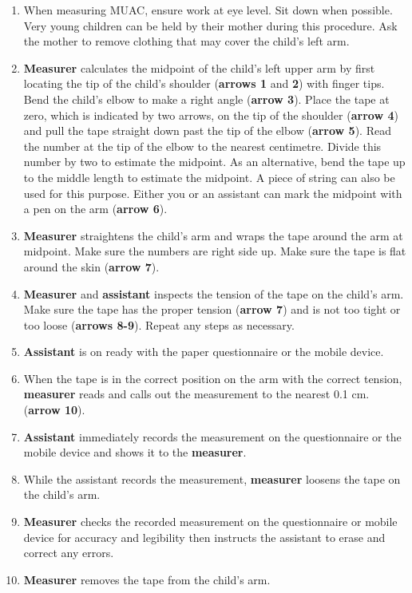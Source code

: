 \documentclass[12pt,]{book}
\theoremstyle{definition}
\theoremstyle{definition}
\theoremstyle{definition}
\theoremstyle{remark}
\begin{document}
\begin{enumerate}
\def\labelenumi{\arabic{enumi}.}
\item
  When measuring MUAC, ensure work at eye level. Sit down when possible.
  Very young children can be held by their mother during this procedure.
  Ask the mother to remove clothing that may cover the child's left arm.
\item
  \textbf{Measurer} calculates the midpoint of the child's left upper
  arm by first locating the tip of the child's shoulder (\textbf{arrows
  1} and \textbf{2}) with finger tips. Bend the child's elbow to make a
  right angle (\textbf{arrow 3}). Place the tape at zero, which is
  indicated by two arrows, on the tip of the shoulder (\textbf{arrow 4})
  and pull the tape straight down past the tip of the elbow
  (\textbf{arrow 5}). Read the number at the tip of the elbow to the
  nearest centimetre. Divide this number by two to estimate the
  midpoint. As an alternative, bend the tape up to the middle length to
  estimate the midpoint. A piece of string can also be used for this
  purpose. Either you or an assistant can mark the midpoint with a pen
  on the arm (\textbf{arrow 6}).
\item
  \textbf{Measurer} straightens the child's arm and wraps the tape
  around the arm at midpoint. Make sure the numbers are right side up.
  Make sure the tape is flat around the skin (\textbf{arrow 7}).
\item
  \textbf{Measurer} and \textbf{assistant} inspects the tension of the
  tape on the child's arm. Make sure the tape has the proper tension
  (\textbf{arrow 7}) and is not too tight or too loose (\textbf{arrows
  8-9}). Repeat any steps as necessary.
\item
  \textbf{Assistant} is on ready with the paper questionnaire or the
  mobile device.
\item
  When the tape is in the correct position on the arm with the correct
  tension, \textbf{measurer} reads and calls out the measurement to the
  nearest 0.1 cm. (\textbf{arrow 10}).
\item
  \textbf{Assistant} immediately records the measurement on the
  questionnaire or the mobile device and shows it to the
  \textbf{measurer}.
\item
  While the assistant records the measurement, \textbf{measurer} loosens
  the tape on the child's arm.
\item
  \textbf{Measurer} checks the recorded measurement on the questionnaire
  or mobile device for accuracy and legibility then instructs the
  assistant to erase and correct any errors.
\item
  \textbf{Measurer} removes the tape from the child's arm.
\end{enumerate}
\end{document}
